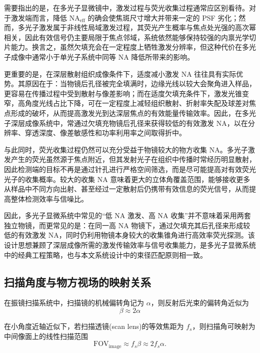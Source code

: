 需要指出的是，在多光子显微镜中，激发过程与荧光收集过程通常应区别看待。对于激发端而言，降低 $\mathrm{NA}_{\mathrm{eff}}$ 的确会使焦斑尺寸增大并带来一定的 PSF 劣化；然而，多光子激发属于非线性局域激发过程，其荧光产生概率与焦点处光强的高次幂相关，因此有效信号仍主要局限于焦点邻域，系统依然能够保持较强的内禀光学切片能力。换言之，虽然欠填充会在一定程度上牺牲激发分辨率，但这种代价在多光子成像中通常小于单光子系统中同等 NA 降低所带来的影响。

更重要的是，在深层散射组织成像条件下，适度减小激发 NA 往往具有实际优势\cite{RN372}。其原因在于：当物镜后孔径被完全填满时，边缘光线以较大会聚角进入样品，更容易在传播过程中受到散射与像差影响；而在适度欠填充条件下，激发光锥变窄，高角度光线占比下降，可在一定程度上减轻组织散射、折射率失配及球差对焦点形成的破坏，从而提高激发光到达深层焦点的有效能量传输效率。因此，在多光子深层成像系统中，常通过欠填充物镜后孔径来获得较低的有效激发 NA，以在分辨率、穿透深度、像差敏感性和功率利用率之间取得折中。

与此同时，荧光收集过程仍然可以充分受益于物镜较大的物方收集 NA。多光子激发产生的荧光虽然源于焦点附近，但其发射光子在组织中传播时常经历明显散射，因此检测端的目标不再是通过针孔进行严格空间筛选，而是尽可能提高对有效荧光光子的收集概率。较大的收集 NA 意味着更大的立体角覆盖范围，能够接收更多从样品中不同方向出射、甚至经过一定散射后仍携带有效信息的荧光信号，从而提高整体检测效率与信噪比。

因此，多光子显微系统中常见的“低 NA 激发、高 NA 收集”并不意味着采用两套独立物镜，而更常见的是：在同一高 NA 物镜下，通过欠填充其后孔径来形成较低的有效激发 NA，同时仍利用物镜本身较大的收集锥角进行高效率荧光探测。该设计思想兼顾了深层成像所需的激发传输效率与信号收集能力，是多光子显微系统中的经典工程策略，也与本文系统设计中的束径匹配原则相一致。




\subsection{扫描角度与物方视场的映射关系}\label{2.4.3}

在振镜扫描系统中，扫描镜的机械偏转角记为 $\alpha$，则反射后光束的偏转角近似为
\begin{equation}
  \beta \approx 2\alpha
  \label{eq:beta_alpha}
\end{equation}

在小角度近轴近似下，若扫描透镜(scan lens)的等效焦距为 $f_s$，则扫描角可映射为中间像面上的线性扫描范围
\begin{equation}
  \mathrm{FOV}_{\mathrm{image}}\approx f_s\beta \approx 2f_s\alpha.
  \label{eq:fov_image}
\end{equation}

